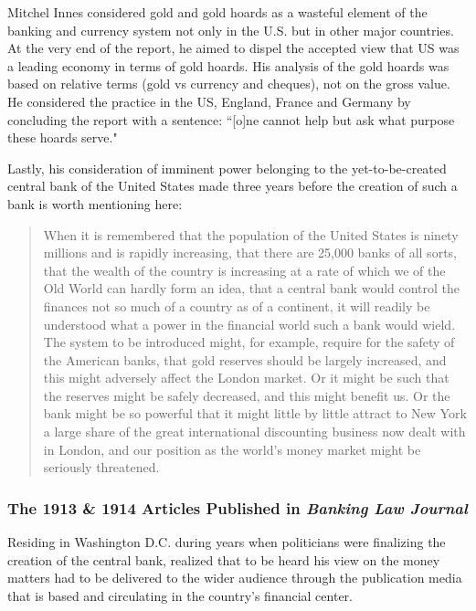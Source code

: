 Mitchel Innes considered gold and gold hoards as a wasteful element of the banking and currency system not only in the U.S. but in other major countries. At the very end of the report, he aimed to dispel the accepted view that US was a leading economy in terms of gold hoards. His analysis of the gold hoards was based on relative terms (gold vs currency and cheques), not on the gross value. He considered the practice in the US, England, France and Germany by concluding the report with a sentence: ``[o]ne cannot help but ask what purpose these hoards serve."

Lastly, his consideration of imminent power belonging to the yet-to-be-created central bank of the United States made three years before the creation of such a bank is worth mentioning here:

\begin{quote}
When it is remembered that the population of the United States is ninety millions and is rapidly increasing, that there are 25,000 banks of all sorts, that the wealth of the country is increasing at a rate of which we of the Old World can hardly form an idea, that a central bank would control the finances not so much of a country as of a continent, it will readily be understood what a power in the financial world such a bank would wield. The system to be introduced might, for example, require for the safety of the American banks, that gold reserves should be largely increased, and this might adversely affect the London market. Or it might be such that the reserves might be safely decreased, and this might benefit us. Or the bank might be so powerful that it might little by little attract to New York a large share of the great international discounting business now dealt with in London, and our position as the world's money market might be seriously threatened.~\citep[pp.~1-2]{innes1910}
\end{quote}

\subsubsection{The 1913 \& 1914 Articles Published in \textit{{Banking Law Journal}}}\label{sec:twokeyarticles}

Residing in Washington D.C. during years when politicians were finalizing the creation of the central bank, \citeauthor{innes1913} realized that to be heard his view on the money matters had to be delivered to the wider audience through the publication media that is based and circulating in the country's financial center. 

